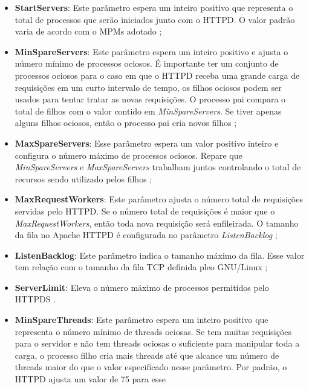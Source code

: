 \begin{itemize}
  \item \textbf{StartServers}: Este parâmetro espera um inteiro positivo que
        representa o total de processos que serão iniciados junto com o HTTPD.
        O valor padrão varia de acordo com o MPMs adotado \cite{mpm_start_server};
  \item \textbf{MinSpareServers}: Este parâmetro espera um inteiro positivo e
        ajusta o número mínimo de processos ociosos. É importante ter um
        conjunto de processos ociosos para o caso em que o HTTPD receba uma
        grande carga de requisições em um curto intervalo de tempo, os filhos
        ociosos podem ser usados para tentar tratar as novas requisições. O
        processo pai compara o total de filhos com o valor contido em
        \textit{MinSpareServers}. Se tiver apenas alguns filhos ociosos, então
        o processo pai cria novos filhos \cite{mpm_min_spare};
  \item \textbf{MaxSpareServers}:
        Esse parâmetro espera um valor positivo inteiro e configura o número
        máximo de processos ociosos. Repare que \textit{MinSpareServers} e
        \textit{MaxSpareServers} trabalham juntos controlando o total de
        recursos sendo utilizado pelos filhos \cite{mpm_max_spare};
  \item \textbf{MaxRequestWorkers}: Este parâmetro ajusta o número total de
        requisições servidas pelo HTTPD. Se o número total de requisições é
        maior que o \textit{MaxRequestWorkers}, então toda nova requisição será
        enfileirada. O tamanho da fila no Apache HTTPD é configurada no
        parâmetro \textit{ListenBacklog} \cite{mpm_max_request};
  \item \textbf{ListenBacklog}: Este parâmetro indica o tamanho máximo da fila.
        Esse valor tem relação com o tamanho da fila TCP definida pleo
        GNU/Linux \cite{mpm_listen};
  \item \textbf{ServerLimit}:
        Eleva o número máximo de processos permitidos pelo HTTPDS
        \cite{mpm_server_limit}.
  \item \textbf{MinSpareThreads}: Este parâmetro espera um inteiro positivo que
        representa o número mínimo de threads ociosas. Se tem muitas
        requisições para o servidor e não tem threads ociosas o suficiente para
        manipular toda a carga, o processo filho cria mais threads até que
        alcance um número de threads maior do que o valor especificado nesse
        parâmetro.  Por padrão, o HTTPD ajusta um valor de 75 para esse

\end{itemize}
